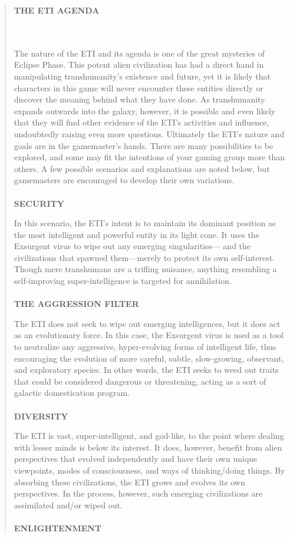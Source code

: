 \begin{quotation}
\begin{large}\textbf{
THE ETI AGENDA}
\end{large}
\\
\\
The nature of the ETI and its agenda is one of the
great mysteries of Eclipse Phase. This potent alien
civilization has had a direct hand in manipulating
transhumanity’s existence and future, yet it is likely
that characters in this game will never encounter
these entities directly or discover the meaning
behind what they have done. As transhumanity
expands outwards into the galaxy, however, it is
possible and even likely that they will find other
evidence of the ETI’s activities and influence, undoubtedly
raising even more questions.
Ultimately the ETI’s nature and goals are in the
gamemaster’s hands. There are many possibilities
to be explored, and some may fit the intentions of
your gaming group more than others. A few possible
scenarios and explanations are noted below,
but gamemasters are encouraged to develop their
own variations.
\\
\\
\textbf{SECURITY}

In this scenario, the ETI’s intent is to maintain its
dominant position as the most intelligent and
powerful entity in its light cone. It uses the Exsurgent
virus to wipe out any emerging singularities—
and the civilizations that spawned them—merely
to protect its own self-interest. Though mere
transhumans are a trifling nuisance, anything
resembling a self-improving super-intelligence is
targeted for annihilation.
\\
\\
\textbf{THE AGGRESSION FILTER}

The ETI does not seek to wipe out emerging intelligences,
but it does act as an evolutionary force.
In this case, the Exsurgent virus is used as a tool
to neutralize any aggressive, hyper-evolving forms
of intelligent life, thus encouraging the evolution
of more careful, subtle, slow-growing, observant,
and exploratory species. In other words, the ETI
seeks to weed out traits that could be considered
dangerous or threatening, acting as a sort of galactic
domestication program.
\\
\\
\textbf{DIVERSITY}

The ETI is vast, super-intelligent, and god-like,
to the point where dealing with lesser minds is
below its interest. It does, however, benefit from
alien perspectives that evolved independently
and have their own unique viewpoints, modes of
consciousness, and ways of thinking/doing things.
By absorbing these civilizations, the ETI grows and
evolves its own perspectives. In the process, however,
such emerging civilizations are assimilated
and/or wiped out.
\\
\\
\textbf{ENLIGHTENMENT}


\end{quotation}
